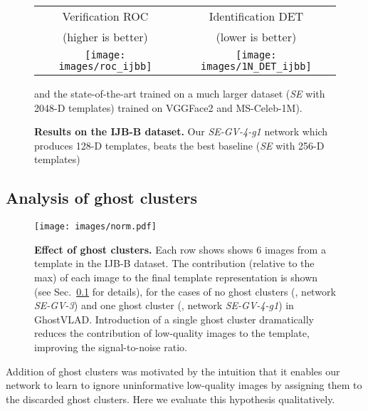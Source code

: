 \documentclass[runningheads]{llncs}
\begin{document}
\begin{figure*}[t]
\captionsetup{font=small}
\begin{center}
\begin{tabular}{c@{~~~~~}c}
Verification ROC & Identification DET \\
{\scriptsize (higher is better)} & {\scriptsize (lower is better)} \\ [0.1cm]
\texttt{[image: images/roc\_ijbb]} &
\texttt{[image: images/1N\_DET\_ijbb]}
\end{tabular}
\end{center}
\vspace{-2mm}
\caption{{\bf Results on the IJB-B dataset.} 
Our \emph{SE-GV-4-g1} network which produces 128-D templates,
beats the best baseline (\emph{SE} with 256-D templates)}
and the state-of-the-art trained on a much larger dataset
(\emph{SE} with 2048-D templates) trained on VGGFace2 and MS-Celeb-1M).
\label{fig:ijb}
\vspace{-4mm}
\end{figure*}



 



\subsection{Analysis of ghost clusters} \label{sec:visualize_ghost}


\begin{figure}[t]
   \begin{center}
         \texttt{[image: images/norm.pdf]}
   \end{center}
\caption{\textbf{Effect of ghost clusters.}
Each row shows shows 6 images from a template in the IJB-B dataset.
The contribution (relative to the max) of each image
to the final template representation is shown
(see Sec.~\ref{sec:visualize_ghost} for details),
for the cases of no ghost clusters (, network \emph{SE-GV-3})
and one ghost cluster (, network \emph{SE-GV-4-g1})
in GhostVLAD.
Introduction of a single ghost cluster dramatically reduces
the contribution of low-quality images to the template,
improving the signal-to-noise ratio.
}
    \label{fig:score}
\end{figure}

Addition of ghost clusters was motivated by the intuition
that it enables our network to learn to ignore uninformative
low-quality images by assigning them to the discarded ghost clusters.
Here we evaluate this hypothesis qualitatively.
\end{document}
